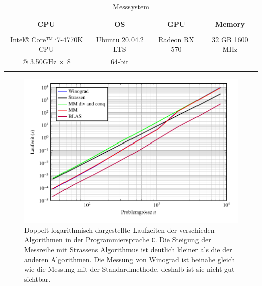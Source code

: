 		 \begin{table}
		 			 \begin{center}
		 					 \begin{tabular}{c c c c}
		 							 \hline
		 							 \hline
		 							 \textbf{CPU} & \textbf{OS} &  \textbf{GPU } & \textbf{Memory }  \\
		 							 \hline
		 							 \multicolumn{4}{c}{} \\
		 							   Intel® Core™ i7-4770K CPU  & Ubuntu 20.04.2 LTS & Radeon RX 570 &  32 GB 1600 MHz   \\
										 @ 3.50GHz × 8  & 64-bit & &    \\
		 							 \multicolumn{4}{c}{} \\
		 							 \hline
		 							 \hline
		 					 \end{tabular}
		 			 \end{center}
		 			 \caption{Messsystem}
		 			 \label{multiplikation:tab:pc_config}
		 	 \end{table}

\begin{figure}
	\center
	\includegraphics[width=\linewidth]{papers/multiplikation/images/meas_c}
	\caption{Doppelt logarithmisch dargestellte Laufzeiten der verschieden Algorithmen in der Programmiersprache \texttt{C}.
	Die Steigung der Messreihe mit Strassens Algorithmus ist deutlich kleiner als die der anderen Algorithmen.
	Die Messung von Winograd ist beinahe gleich wie die Messung mit der Standardmethode, deshalb ist sie nicht gut sichtbar.}
	\label{multiplikation:fig:c_meas_4096}
\end{figure}


